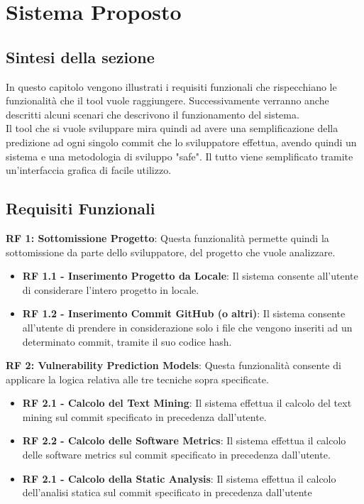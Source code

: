 \documentclass{article}
\begin{document}

\section{Sistema Proposto}
\subsection{Sintesi della sezione}
In questo capitolo vengono illustrati i requisiti funzionali che rispecchiano le funzionalità che il tool vuole raggiungere. Successivamente verranno anche descritti alcuni scenari che descrivono il funzionamento del sistema.\\
Il tool che si vuole sviluppare mira quindi ad avere una semplificazione della predizione ad ogni singolo commit che lo sviluppatore effettua, avendo quindi un sistema e una metodologia di sviluppo "safe". Il tutto viene semplificato tramite un'interfaccia grafica di facile utilizzo.

\subsection{Requisiti Funzionali}
\textbf{RF 1: Sottomissione Progetto}: Questa funzionalità permette quindi la sottomissione da parte dello sviluppatore, del progetto che vuole analizzare.

\begin{itemize}
    \item \textbf{RF 1.1 - Inserimento Progetto da Locale}: Il sistema consente all'utente di considerare l'intero progetto in locale.
    \item \textbf{RF 1.2 - Inserimento Commit GitHub (o altri)}: Il sistema consente all'utente di prendere in considerazione solo i file che vengono inseriti ad un determinato commit, tramite il suo codice hash.
\end{itemize}
\textbf{RF 2: Vulnerability Prediction Models}: Questa funzionalità consente di applicare la logica relativa alle tre tecniche sopra specificate.

\begin{itemize}
    \item \textbf{RF 2.1 - Calcolo del Text Mining}: Il sistema effettua il calcolo del text mining sul commit specificato in precedenza dall'utente.
     \item \textbf{RF 2.2 - Calcolo delle Software Metrics}: Il sistema effettua il calcolo delle software metrics sul commit specificato in precedenza dall'utente.
      \item \textbf{RF 2.1 - Calcolo della Static Analysis}: Il sistema effettua il calcolo dell'analisi statica sul commit specificato in precedenza dall'utente
\end{itemize}
\end{document}
